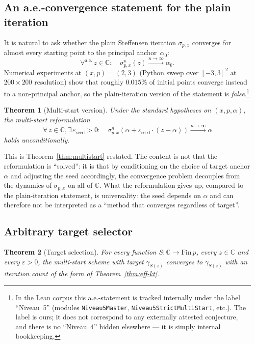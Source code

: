 \documentclass[11pt,a4paper]{article}
\newtheorem{theorem}{Theorem}[section]
\theoremstyle{definition}
\theoremstyle{remark}
\begin{document}
\subsection{An a.e.-convergence statement for the plain iteration}

It is natural to ask whether the plain Steffensen iteration
$\sigma_{p,x}$ converges for almost every starting point to the
principal anchor~$\alpha_0$:
\[
  \forall^{\mathrm{a.e.}}\,z \in \mathbb{C}: \quad
  \sigma_{p,x}^n(z) \xrightarrow{n \to \infty} \alpha_0.
\]
Numerical experiments at $(x, p) = (2, 3)$ (Python sweep over
$[-3, 3]^2$ at $200 \times 200$ resolution) show that roughly
$0.015\%$ of initial points converge instead to a non-principal
anchor, so the plain-iteration version of the statement is
\emph{false}.\footnote{In the Lean corpus this a.e.-statement is
tracked internally under the label ``Niveau~5'' (modules
\texttt{Niveau5Master}, \texttt{Niveau5StrictMultiStart}, etc.). The
label is ours; it does not correspond to any externally attested
conjecture, and there is no ``Niveau~4'' hidden elsewhere — it is
simply internal bookkeeping.}

\begin{theorem}[Multi-start version]\label{thm:niveau5}
Under the standard hypotheses on $(x, p, \alpha)$, the multi-start
reformulation
\[
  \forall\,z \in \mathbb{C}, \exists\,\varepsilon_{\mathrm{seed}} > 0:\quad
  \sigma_{p,x}^n(\alpha + \varepsilon_{\mathrm{seed}} \cdot (z - \alpha))
  \xrightarrow{n \to \infty} \alpha
\]
holds unconditionally.
\end{theorem}

This is Theorem~\ref{thm:multistart} restated. The content is not that
the reformulation is ``solved'': it is that by conditioning on the
choice of target anchor $\alpha$ and adjusting the seed accordingly,
the convergence problem decouples from the dynamics of $\sigma_{p,x}$
on all of $\mathbb{C}$. What the reformulation gives up, compared to
the plain-iteration statement, is universality: the seed depends on
$\alpha$ and can therefore not be interpreted as a ``method that
converges regardless of target''.

\subsection{Arbitrary target selector}

\begin{theorem}[Target selection]\label{thm:galois-equiv}
For every function $S : \mathbb{C} \to \mathrm{Fin}\,p$, every
$z \in \mathbb{C}$ and every $\varepsilon > 0$, the multi-start scheme
with target $\gamma_{S(z)}$ converges to $\gamma_{S(z)}$ with an
iteration count of the form of Theorem~\ref{thm:eff-kt}.
\end{theorem}
\end{document}
